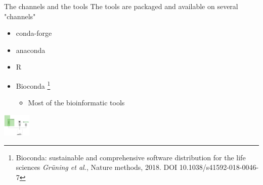 \begin{frame}{The channels and the tools}
The tools are packaged and available on several "channels"
\begin{itemize}
\item conda-forge
\item anaconda
\item R
\item Bioconda \footnote{Bioconda: sustainable and comprehensive software distribution for the life sciences \textit{Grüning et al.}, Nature methods, 2018. DOI 10.1038/s41592-018-0046-7}
	\begin{itemize}
	\item Most of the bioinformatic tools
	\end{itemize}
\end{itemize}
\includegraphics[width=0.1\textwidth]{images/conda_env_detail.pdf} 

\end{frame}